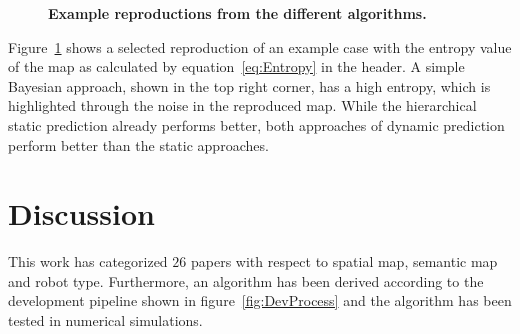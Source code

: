 \documentclass[twocolumn,letterpaper]{IEEEAerospaceCLS}  %
\begin{document}
\begin{figure}
    \centering
    \caption{\bf{
        Example reproductions from the different algorithms. 
    }}
    \label{fig:SampRes}
\end{figure}
Figure~\ref{fig:SampRes} shows a selected reproduction of an example case with the entropy value of the map as calculated by equation~\ref{eq:Entropy} in the header. A simple Bayesian approach, shown in the top right corner, has a high entropy, which is highlighted through the noise in the reproduced map. While the hierarchical static prediction already performs better, both approaches of dynamic prediction perform better than the static approaches.
\section{Discussion} \label{sec:Disc}
This work has categorized $26$ papers with respect to spatial map, semantic map and robot type. Furthermore, an algorithm has been derived according to the development pipeline shown in figure~\ref{fig:DevProcess} and the algorithm has been tested in numerical simulations.
\end{document}
